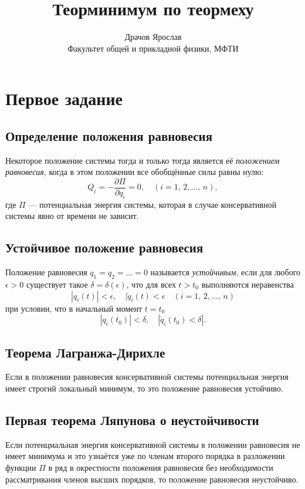 \documentclass[a4paper,12pt]{article}
\title{Теорминимум
по теормеху}
\author{Драчов Ярослав\\ Факультет общей и прикладной физики, МФТИ}
\begin{document}
%
\maketitle
\tableofcontents

\section{Первое задание}
\subsection{Определение положения равновесия}
\begin{dfn}
	Некоторое положение системы тогда и только тогда является её
	\emph{положением
	равновесия}, когда в этом положении все обобщённые силы равны нулю:
	\[
		Q_i=-\frac{\partial \Pi}{\partial q_i} =0, \quad (i=1,\,2,\ldots
		,\,n),
	\] 
	где $\Pi$ --- потенциальная энергия системы, которая в случае
	консервативной системы явно от времени не зависит.
\end{dfn}
\subsection{Устойчивое положение равновесия}
\begin{dfn}
	Положение равновесия $q_1=q_2=\ldots=0$ называется  \emph{устойчивым},
	если для любого $\epsilon >0$ существует такое $\delta=\delta(\epsilon)$,
	что для всех $t>t_0$ выполняются неравенства
	\[
		|q_i(t)|<\epsilon,\quad |\dot{q}_i(t)<\epsilon \quad(i=1,\,2,\ldots
		,\,n)
	\] 
	при условии, что в начальный момент $t=t_0$ 
	\[
		|q_i(t_0)|<\delta,\quad |\dot{q}_i(t_0)<\delta|
	.\] 
\end{dfn}
\subsection{Теорема Лагранжа-Дирихле}
\begin{thm}
	Если в положении равновесия консервативной системы потенциальная 
	энергия имеет строгий  локальный минимум,  то это положение равновесия
	устойчиво.
\end{thm}
\subsection{Первая теорема Ляпунова о неустойчивости}
\begin{thm}[Ляпунова, 1-я]
Если потенцмальная энергия консервативной системы в положении равновесия не
имеет минимума и это узнаётся уже по членам второго порядка в разложении
функции $\Pi$ в ряд в окрестности положения равновесия без необходимости
рассматривания членов высших порядков, то положение равновесия неустойчиво.
\end{thm}
\end{document}
